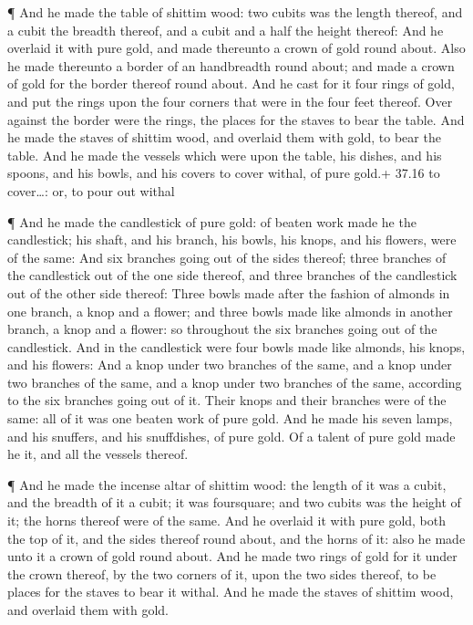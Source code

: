  ¶ And he made the table of shittim wood: two cubits was
the length thereof, and a cubit the breadth thereof, and a cubit and a
half the height thereof:  And he overlaid it with pure
gold, and made thereunto a crown of gold round about.  Also
he made thereunto a border of an handbreadth round about; and made a
crown of gold for the border thereof round about.  And he
cast for it four rings of gold, and put the rings upon the four corners
that were in the four feet thereof.  Over against the
border were the rings, the places for the staves to bear the table.
 And he made the staves of shittim wood, and overlaid them
with gold, to bear the table.  And he made the vessels
which were upon the table, his dishes, and his spoons, and his bowls,
and his covers to cover withal, of pure gold.+ 37.16 to cover\ldots: or,
to pour out withal

 ¶ And he made the candlestick of pure gold: of beaten work
made he the candlestick; his shaft, and his branch, his bowls, his
knops, and his flowers, were of the same:  And six branches
going out of the sides thereof; three branches of the candlestick out of
the one side thereof, and three branches of the candlestick out of the
other side thereof:  Three bowls made after the fashion of
almonds in one branch, a knop and a flower; and three bowls made like
almonds in another branch, a knop and a flower: so throughout the six
branches going out of the candlestick.  And in the
candlestick were four bowls made like almonds, his knops, and his
flowers:  And a knop under two branches of the same, and a
knop under two branches of the same, and a knop under two branches of
the same, according to the six branches going out of it. 
Their knops and their branches were of the same: all of it was one
beaten work of pure gold.  And he made his seven lamps, and
his snuffers, and his snuffdishes, of pure gold.  Of a
talent of pure gold made he it, and all the vessels thereof.

 ¶ And he made the incense altar of shittim wood: the
length of it was a cubit, and the breadth of it a cubit; it was
foursquare; and two cubits was the height of it; the horns thereof were
of the same.  And he overlaid it with pure gold, both the
top of it, and the sides thereof round about, and the horns of it: also
he made unto it a crown of gold round about.  And he made
two rings of gold for it under the crown thereof, by the two corners of
it, upon the two sides thereof, to be places for the staves to bear it
withal.  And he made the staves of shittim wood, and
overlaid them with gold.

